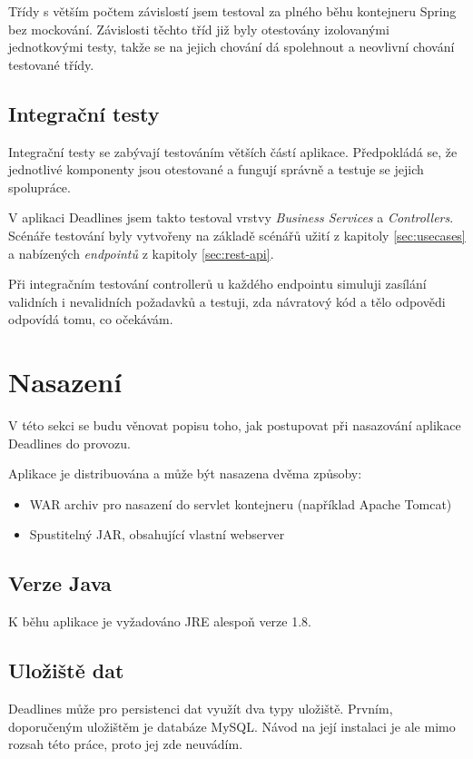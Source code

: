 \documentclass[thesis=B,czech]{FITthesis}[2012/06/26]
\begin{document}
		Třídy s větším počtem závislostí jsem testoval za plného běhu kontejneru Spring bez mockování. Závislosti těchto tříd již byly otestovány izolovanými jednotkovými testy, takže se na jejich chování dá spolehnout a neovlivní chování testované třídy.
		
	\section{Integrační testy}
		Integrační testy se zabývají testováním větších částí aplikace. Předpokládá se, že jednotlivé komponenty jsou otestované a fungují správně a testuje se jejich spolupráce.
		
		V aplikaci Deadlines jsem takto testoval vrstvy \textit{Business Services} a \textit{Controllers}. Scénáře testování byly vytvořeny na základě scénářů užití z kapitoly \ref{sec:usecases} a nabízených \textit{endpointů} z kapitoly \ref{sec:rest-api}.
		
		Při integračním testování controllerů u každého endpointu simuluji zasílání validních i nevalidních požadavků a testuji, zda návratový kód a tělo odpovědi odpovídá tomu, co očekávám.


\chapter{Nasazení}
	\label{chapter:deployment}
	
	V této sekci se budu věnovat popisu toho, jak postupovat při nasazování aplikace Deadlines do provozu.
	
	Aplikace je distribuována a může být nasazena dvěma způsoby:
	\begin{itemize}
		\item WAR archiv pro nasazení do servlet kontejneru (například Apache Tomcat)
		\item Spustitelný JAR, obsahující vlastní webserver
	\end{itemize}
	
	\section{Verze Java}
		K běhu aplikace je vyžadováno JRE alespoň verze 1.8.
	
	\section{Uložiště dat}
		Deadlines může pro persistenci dat využít dva typy uložiště. Prvním, doporučeným uložištěm je databáze MySQL. Návod na její instalaci je ale mimo rozsah této práce, proto jej zde neuvádím.
	
\end{document}
